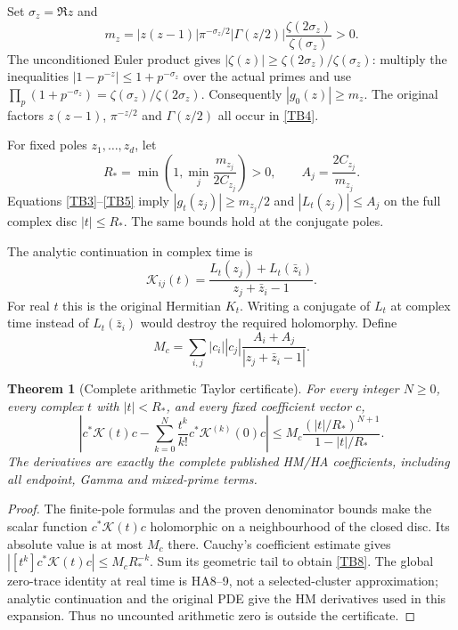 \documentclass[11pt,a4paper]{article}
\newtheorem{theorem}{Theorem}[section]
\theoremstyle{definition}\newtheorem{definition}[theorem]{Definition}
\begin{document}
Set $\sigma_z=\Re z$ and
\begin{equation}
 m_z=|z(z-1)|\pi^{-\sigma_z/2}|\Gamma(z/2)|
               \frac{\zeta(2\sigma_z)}{\zeta(\sigma_z)}>0.
                                                               \tag{TB4}\label{TB4}
\end{equation}
The unconditioned Euler product gives $|\zeta(z)|\ge\zeta(2\sigma_z)/\zeta(\sigma_z)$: multiply the inequalities
$|1-p^{-z}|\le1+p^{-\sigma_z}$ over the actual primes and use
$\prod_p(1+p^{-\sigma_z})=\zeta(\sigma_z)/\zeta(2\sigma_z)$.
Consequently $|g_0(z)|\ge m_z$. The original factors $z(z-1)$, $\pi^{-z/2}$ and $\Gamma(z/2)$ all occur in \eqref{TB4}.

For fixed poles $z_1,\ldots,z_d$, let
\begin{equation}
 R_* =\min\left(1,\min_j\frac{m_{z_j}}{2C_{z_j}}\right)>0,
 \qquad A_j=\frac{2C_{z_j}}{m_{z_j}}.                         \tag{TB5}\label{TB5}
\end{equation}
Equations \eqref{TB3}--\eqref{TB5} imply
$|g_t(z_j)|\ge m_{z_j}/2$ and $|L_t(z_j)|\le A_j$ on the full complex disc $|t|\le R_*$. The same bounds hold at the conjugate poles.

The analytic continuation in complex time is
\begin{equation}
 \mathcal K_{ij}(t)=
 \frac{L_t(z_j)+L_t(\bar z_i)}{z_j+\bar z_i-1}.
                                                               \tag{TB6}\label{TB6}
\end{equation}
For real $t$ this is the original Hermitian $K_t$. Writing a conjugate of $L_t$ at complex time instead of $L_t(\bar z_i)$ would destroy the required holomorphy. Define
\begin{equation}
 M_c=\sum_{i,j}|c_i||c_j|
             \frac{A_i+A_j}{|z_j+\bar z_i-1|}.
                                                               \tag{TB7}\label{TB7}
\end{equation}

\begin{theorem}[Complete arithmetic Taylor certificate]
For every integer $N\ge0$, every complex $t$ with $|t|<R_*$, and every fixed coefficient vector $c$,
\begin{equation}
 \boxed{\left|c^*\mathcal K(t)c-
  \sum_{k=0}^N\frac{t^k}{k!}c^*\mathcal K^{(k)}(0)c\right|
 \le M_c\frac{(|t|/R_*)^{N+1}}{1-|t|/R_*}.}                 \tag{TB8}\label{TB8}
\end{equation}
The derivatives are exactly the complete published HM/HA coefficients, including all endpoint, Gamma and mixed-prime terms.
\end{theorem}
\begin{proof}
The finite-pole formulas and the proven denominator bounds make the scalar function $c^*\mathcal K(t)c$ holomorphic on a neighbourhood of the closed disc. Its absolute value is at most $M_c$ there. Cauchy's coefficient estimate gives $|[t^k]c^*\mathcal K(t)c|\le M_cR_*^{-k}$. Sum its geometric tail to obtain \eqref{TB8}. The global zero-trace identity at real time is HA8--9, not a selected-cluster approximation; analytic continuation and the original PDE give the HM derivatives used in this expansion. Thus no uncounted arithmetic zero is outside the certificate.
\end{proof}
\end{document}
